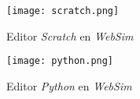 \begin{figure}[h!]
    \centering
    \texttt{[image: scratch.png]} 
    \caption{Editor \textit{Scratch} en \textit{WebSim}}
    \label{fig:scratch}
\end{figure}

\begin{figure}[h!]
    \centering
    \texttt{[image: python.png]} 
    \caption{Editor \textit{Python} en \textit{WebSim}}
    \label{fig:python}
\end{figure}